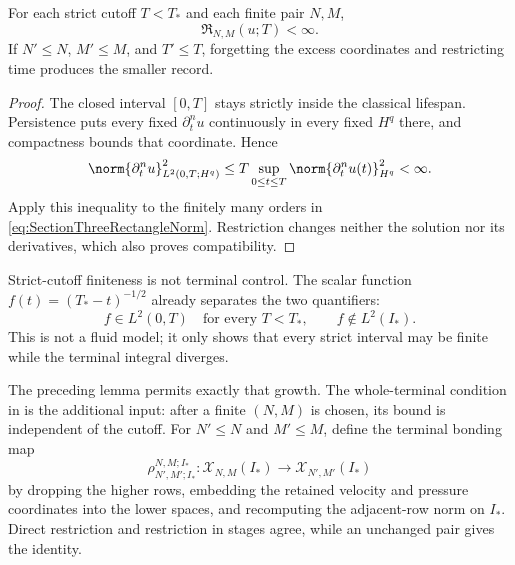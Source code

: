 \begin{lemma}\label{lem:StrictSubintervalRectangles}
For each strict cutoff \(T<T_*\) and each finite pair \(N,M\),
\begin{equation}\label{eq:AppendixStrictSubintervalRectangleBound}
  \mathfrak R_{N,M}(u;T)<\infty.
\end{equation}
If \(N'\leq N\), \(M'\leq M\), and \(T'\leq T\), forgetting the excess
coordinates and restricting time produces the smaller record.
\end{lemma}

\begin{proof}
The closed interval \([0,T]\) stays strictly inside the classical lifespan.
Persistence puts every fixed \(\partial_t^nu\) continuously in every fixed
\(H^q\) there, and compactness bounds that coordinate.  Hence
\[
  \norm{\partial_t^n u}_{L^2(0,T;H^q)}^2
  \leq
  T\sup_{0\leq t\leq T}
  \norm{\partial_t^n u(t)}_{H^q}^{2}
  <\infty.
\]
Apply this inequality to the finitely many orders in
\eqref{eq:SectionThreeRectangleNorm}.  Restriction changes neither the solution
nor its derivatives, which also proves compatibility.
\end{proof}

Strict-cutoff finiteness is not terminal control.  The scalar function
\(f(t)=(T_*-t)^{-1/2}\) already separates the two quantifiers:
\[
  f\in L^2(0,T)\quad\text{for every }T<T_*,
  \qquad
  f\notin L^2(I_*).
\]
This is not a fluid model; it only shows that every strict interval may be
finite while the terminal integral diverges.

The preceding lemma permits exactly that growth.  The whole-terminal condition
in  is the additional input: after
a finite \((N,M)\) is chosen, its bound is independent of the cutoff.  For
\(N'\leq N\) and \(M'\leq M\), define the terminal bonding map
\[
  \rho_{N',M';I_*}^{N,M;I_*}:
  \mathscr X_{N,M}(I_*)
  \longrightarrow
  \mathscr X_{N',M'}(I_*)
\]
by dropping the higher rows, embedding the retained velocity and pressure
coordinates into the lower spaces, and recomputing the adjacent-row norm on
\(I_*\).  Direct restriction and restriction in stages agree, while an unchanged
pair gives the identity.

